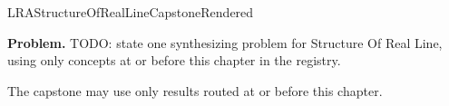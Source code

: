 \ifcsname LRAStructureOfRealLineCapstoneRendered\endcsname
\else
\expandafter\gdef\csname LRAStructureOfRealLineCapstoneRendered\endcsname{}

\newpage
{}
\label{cap:structure-of-real-line}

\begin{tcolorbox}[
  colback=gray!6,
  colframe=gray!40,
  arc=2pt,
  left=8pt, right=8pt, top=6pt, bottom=6pt,
  title={\small\textbf{Capstone Problem}},
  fonttitle=\small\bfseries
]
\textbf{Problem.}
TODO: state one synthesizing problem for Structure Of Real Line, using only concepts at or
before this chapter in the registry.
\end{tcolorbox}

\begin{remark*}
The capstone may use only results routed at or before this chapter.
\end{remark*}

\clearpage
\fi
